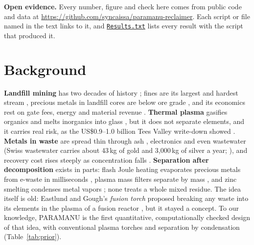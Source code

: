 \documentclass[11pt,a4paper]{article}
\newcommand{\gh}[2]{\href{https://github.com/syncaissa/paramanu-reclaimer/blob/main/#1}{\texttt{#2}}}
\theoremstyle{definition}
\theoremstyle{plain}
\theoremstyle{remark}
\begin{document}
\textbf{Open evidence.} Every number, figure and check here comes from public code and data at \url{https://github.com/syncaissa/paramanu-reclaimer}. Each script or file named in the text links to it, and \gh{Results.txt}{Results.txt} lists every result with the script that produced it.

\section{Background}\label{sec:background}

\textbf{Landfill mining} has two decades of history \citep{krook2012}; fines are its largest and hardest stream \citep{quaghebeur2013,hernandez2018,burlakovs2018}, precious metals in landfill cores are below ore grade \citep{gutierrez2015}, and its economics rest on gate fees, energy and material revenue \citep{laner2019}. \textbf{Thermal plasma} gasifies organics and melts inorganics into glass \citep{heberlein2008,gomez2009,bosmans2013}, but it does not separate elements, and it carries real risk, as the US\$0.9--1.0 billion Tees Valley write-down showed \citep{icheme2016}. \textbf{Metals in waste} are spread thin through ash \citep{morf2013}, electronics \citep{cui2008} and even wastewater (Swiss wastewater carries about 43\,kg of gold and 3,000\,kg of silver a year; \citealp{vriens2017}), and recovery cost rises steeply as concentration falls \citep{sherwood1959,johnson2007}. \textbf{Separation after decomposition} exists in parts: flash Joule heating evaporates precious metals from e-waste in milliseconds \citep{deng2021}, plasma mass filters separate by mass \citep{gueroult2015,zweben2018}, and zinc smelting condenses metal vapors \citep{cusano2017bref}; none treats a whole mixed residue. The idea itself is old: Eastlund and Gough's \emph{fusion torch} proposed breaking any waste into its elements in the plasma of a fusion reactor \citep{eastlund1969}, but it stayed a concept. To our knowledge, PARAMANU is the first quantitative, computationally checked design of that idea, with conventional plasma torches and separation by condensation (Table~\ref{tab:prior}).
\end{document}
